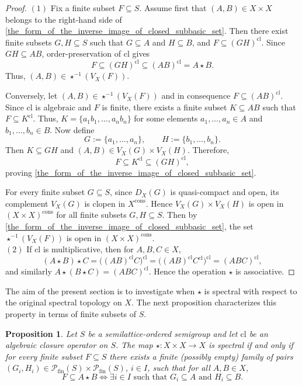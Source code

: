 \documentclass[10pt, reqno]{amsart}
\theoremstyle{plain}
\newtheorem{prop}[theorem]{Proposition}
\theoremstyle{definition}
\begin{document}
\begin{proof}
    $(1)$ Fix a finite subset $F \subseteq S$. Assume first that $(A, B)\in X \times X$ belongs to the right-hand side of \eqref{the_form_of_the_inverse_image_of_closed_subbasic_set}. Then there exist finite subsets $G, H\subseteq S$ such that $G \subseteq A$ and $H \subseteq B$, and $F \subseteq (GH)^\mathrm{cl}$. Since $GH \subseteq AB$, order-preservation of $\mathrm{cl}$ gives $$F \subseteq (GH)^\mathrm{cl} \subseteq (AB)^\mathrm{cl} = A\star B.$$ Thus, $(A, B)\in \star^{-1}(V_X(F))$. 

    Conversely, let $(A, B)\in \star^{-1}(V_X(F))$ and in consequence $F \subseteq (AB)^\mathrm{cl}$. Since $\mathrm{cl}$ is algebraic and $F$ is finite, there exists a finite subset $K\subseteq AB$ such that $F\subseteq K^\mathrm{cl}$. Thus, $K = \{a_1b_1, \ldots, a_nb_n\}$ for some elements $a_1, \ldots, a_n\in A$ and $b_1,\ldots, b_n\in B$. Now define $$G := \{a_1, \ldots, a_n\}, \qquad H := \{b_1, \ldots, b_n\}.$$ Then $K \subseteq GH$ and $(A , B)\in V_X(G) \times V_X(H)$. Therefore, $$F \subseteq K^\mathrm{cl} \subseteq (GH)^\mathrm{cl},$$ proving \eqref{the_form_of_the_inverse_image_of_closed_subbasic_set}. 
    
    For every finite subset $G\subseteq S$, since $D_X(G)$ is quasi-compact and open, its complement $V_X(G)$ is clopen in $X^\mathrm{cons}$. Hence $V_X(G)\times V_X(H)$ is open in $(X\times X)^\mathrm{cons}$ for all finite subsets $G, H\subseteq S$. Then by \eqref{the_form_of_the_inverse_image_of_closed_subbasic_set}, the set $\star^{-1}(V_X(F))$ is open in $(X\times X)^\mathrm{cons}$. 
    \\
    $(2)$ If $\mathrm{cl}$ is multiplicative, then for $A, B, C\in X$,
    \begin{equation*}
        (A \star B) \star C = \big((AB)^\mathrm{cl}C\big)^\mathrm{cl} = \big((AB)^\mathrm{cl}C^\mathrm{cl}\big)^\mathrm{cl} = (ABC)^\mathrm{cl}, 
    \end{equation*}
    and similarly $A \star (B \star C) = (ABC)^\mathrm{cl}$. Hence the operation $\star$ is associative. 
\end{proof}
The aim of the present section is to investigate when $\star$ is spectral with respect to the original spectral topology on $X$. The next proposition characterizes this property in terms of finite subsets of $S$. 
\begin{prop}\label{criterion_for_joint_spectrality}
    Let $S$ be a semilattice-ordered semigroup and let $\mathrm{cl}$ be an algebraic closure operator on $S$. The map $\star : X \times X \rightarrow X$ is spectral if and only if for every finite subset $F \subseteq S$ there exists a finite (possibly empty) family of pairs $(G_i, H_i) \in \mathcal{P}_\mathrm{fin}(S) \times \mathcal{P}_\mathrm{fin}(S)$, $i \in I$,
    such that for all $A, B\in X$, 
    \begin{equation*}
        F \subseteq A \star B \iff \exists i\in I \text{ such that } G_i \subseteq A \text{ and } H_i\subseteq B. 
    \end{equation*}
\end{prop}
\end{document}
